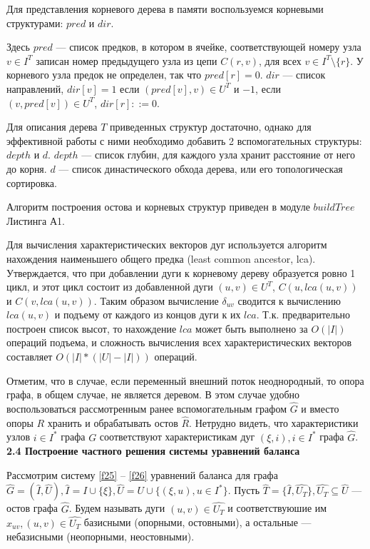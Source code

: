 \documentclass[14pt]{extarticle}%
\begin{document}
Для представления корневого дерева в памяти воспользуемся корневыми структурами: $pred$ и $dir$. 

Здесь $pred$ --- список предков, в котором в ячейке, соответствующей номеру узла $v\in I^T$ записан номер предыдущего узла из цепи $C(r,v)$, для всех $v\in I^T\setminus \{r\}$. У корневого узла предок не определен, так что $pred[r]=0$. $dir$ --- список направлений, $dir[v]=1$ если $(pred[v],v)\in U^T$ и $-1$, если $(v,pred[v])\in U^T$, $dir[r]::=0$.

Для описания дерева $T$ приведенных структур достаточно, однако для эффективной работы с ними необходимо добавить 2 вспомогательных структуры: $depth$ и $d$. $depth$ --- список глубин, для каждого узла хранит расстояние от него до корня. $d$ --- список династического обхода дерева, или его топологическая сортировка.

Алгоритм построения остова и корневых структур приведен в модуле $buildTree$ Листинга А1.

Для вычисления характеристических векторов дуг используется алгоритм нахождения наименьшего общего предка (least common ancestor, lca). Утверждается, что при добавлении дуги к корневому дереву образуется ровно 1 цикл, и этот цикл состоит из добавленной дуги $(u,v)\in U^T$, $C(u,lca(u,v))$ и $C(v,lca(u,v))$. Таким образом вычисление $\delta_{uv}$ сводится к вычислению $lca(u,v)$ и подъему от каждого из концов дуги к их $lca$. Т.к. предварительно построен список высот, то нахождение $lca$ может быть выполнено за $O(|I|)$ операций подъема, и сложность вычисления всех характеристических векторов составляет $O(|I|*(|U|-|I|))$ операций.

Отметим, что в случае, если переменный внешний поток неоднородный, то опора графа, в общем случае, не является деревом. В этом случае удобно воспользоваться рассмотренным ранее вспомогательным графом $\widehat{G}$ и вместо опоры $R$ хранить и обрабатывать остов $\widehat{R}$. Нетрудно видеть, что характеристики узлов $i\in I^*$ графа $G$ соответствуют характеристикам дуг $(\xi,i), i\in I^*$ графа $\widehat{G}$.
\\

\textbf{2.4 Построение частного решения системы уравнений баланса}

Рассмотрим систему \eqref{f25} -- \eqref{f26} уравнений баланса для графа $\widehat{G}=(\widehat{I},\widehat{U}), \widehat{I}=I\cup\{\xi\}, \widehat{U}=U\cup\{(\xi,u),u\in I^*\}$. Пусть $\widehat{T}=\{\widehat{I},\widehat{U_T}\}, \widehat{U_T}\subseteq \widehat{U}$ --- остов графа $\widehat{G}$. Будем называть дуги $(u,v)\in \widehat{U_T}$ и соответствуюшие им $x_{uv}, (u,v)\in \widehat{U_T}$ базисными (опорными, остовными), а остальные --- небазисными (неопорными, неостовными).
\end{document}
